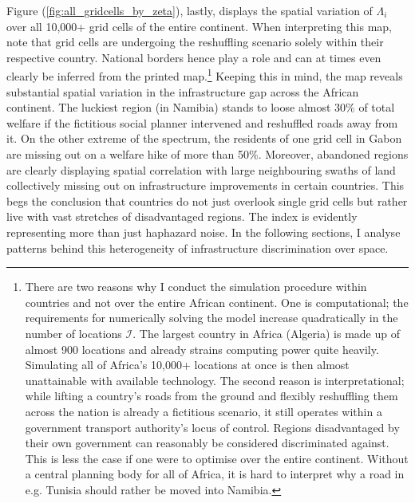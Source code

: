 \documentclass[11pt, oneside]{article}   	%
\let\oldref\ref
\renewcommand{\ref}[1]{(\oldref{#1})}
\begin{document}
Figure \ref{fig:all_gridcells_by_zeta}, lastly, displays the spatial variation of $\Lambda_{i}$ over all 10,000+ grid cells of the entire continent. When interpreting this map, note that grid cells are undergoing the reshuffling scenario solely within their respective country. National borders hence play a role and can at times even clearly be inferred from the printed map.\footnote{There are two reasons why I conduct the simulation procedure within countries and not over the entire African continent. One is computational; the requirements for numerically solving the model increase quadratically in the number of locations $\mathcal{I}$. The largest country in Africa (Algeria) is made up of almost 900 locations and already strains computing power quite heavily. Simulating all of Africa's 10,000+ locations at once is then almost unattainable with available technology. The second reason is interpretational; while lifting a country's roads from the ground and flexibly reshuffling them across the nation is already a fictitious scenario, it still operates within a government transport authority's locus of control. Regions disadvantaged by their own government can reasonably be considered discriminated against. This is less the case if one were to optimise over the entire continent. Without a central planning body for all of Africa, it is hard to interpret why a road in e.g. Tunisia should rather be moved into Namibia.}  Keeping this in mind, the map reveals substantial spatial variation in the infrastructure gap across the African continent. The luckiest region (in Namibia) stands to loose almost 30\% of total welfare if the fictitious social planner intervened and reshuffled roads away from it. On the other extreme of the spectrum, the residents of one grid cell in Gabon are missing out on a welfare hike of more than 50\%. Moreover, abandoned regions are clearly displaying spatial correlation with large neighbouring swaths of land collectively missing out on infrastructure improvements in certain countries. This begs the conclusion that countries do not just overlook single grid cells but rather live with vast stretches of disadvantaged regions. The index is evidently representing more than just haphazard noise. In the following sections, I analyse patterns behind this heterogeneity of infrastructure discrimination over space.
\end{document}
